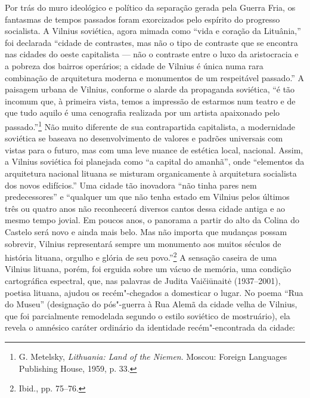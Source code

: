 Por trás do muro ideológico e político da separação gerada pela Guerra
Fria, os fantasmas de tempos passados foram exorcizados pelo espírito do
progresso socialista. A Vilnius soviética, agora mimada como ``vida e
coração da Lituânia,'' foi declarada ``cidade de contrastes, mas não o
tipo de contraste que se encontra nas cidades do oeste capitalista --- não
o contraste entre o luxo da aristocracia e a pobreza dos bairros
operários; a cidade de Vilnius é única numa rara combinação de
arquitetura moderna e monumentos de um respeitável passado.'' A paisagem
urbana de Vilnius, conforme o alarde da propaganda soviética, ``é tão
incomum que, à primeira vista, temos a impressão de estarmos num teatro
e de que tudo aquilo é uma cenografia realizada por um artista
apaixonado pelo passado.''\footnote{G. Metelsky, \emph{Lithuania: Land
  of the Niemen}. Moscou: Foreign Languages Publishing House, 1959, p.
  33.} Não muito diferente de sua contrapartida capitalista, a
modernidade soviética se baseava no desenvolvimento de valores e padrões
universais com vistas para o futuro, mas com uma leve nuance de estética
local, nacional. Assim, a Vilnius soviética foi planejada como ``a
capital do amanhã'', onde ``elementos da arquitetura nacional lituana se
misturam organicamente à arquitetura socialista dos novos edifícios.''
Uma cidade tão inovadora ``não tinha pares nem predecessores'' e
``qualquer um que não tenha estado em Vilnius pelos últimos três ou
quatro anos não reconhecerá diversos cantos dessa cidade antiga e ao
mesmo tempo jovial. Em poucos anos, o panorama a partir do alto da
Colina do Castelo será novo e ainda mais belo. Mas não importa que
mudanças possam sobrevir, Vilnius representará sempre um monumento aos
muitos séculos de história lituana, orgulho e glória de seu
povo.''\footnote{Ibid., pp. 75--76.} A sensação caseira de uma Vilnius
lituana, porém, foi erguida sobre um vácuo de memória, uma condição
cartográfica espectral, que, nas palavras de Judita Vaičiūnaitė
(1937--2001), poetisa lituana, ajudou os recém"-chegados a domesticar o
lugar. No poema ``Rua do Museu'' (designação do pós"-guerra à Rua Alemã
da cidade velha de Vilnius, que foi parcialmente remodelada segundo o
estilo soviético de mostruário), ela revela o amnésico caráter ordinário
da identidade recém"-encontrada da cidade:


